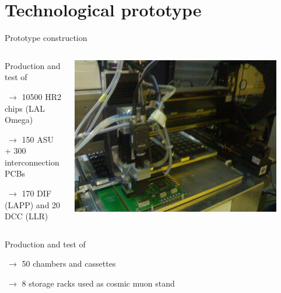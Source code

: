 \documentclass[10pt]{beamer}
\begin{document}
\section{ Technological prototype}
\begin{frame}[shrink=3]{Prototype construction}
  \begin{block}{}

    \begin{columns}

      \begin{column}{0.5\textwidth}
        \begin{block}{}
        { 
          Production and test of 
          \par $ ~\rightarrow$ 10500 HR2 chips  (LAL Omega)
          \par $ ~\rightarrow$  150 ASU + 300 interconnection PCBs
          \par $ ~ \rightarrow$ 170 DIF (LAPP) and 20 DCC (LLR)
        }
        \end{block}
      \end{column}
      
      \begin{column}{0.5\textwidth}
        \centerline{\includegraphics[width=0.9\textwidth]{jpg/ConstructionGantry.jpg}}
      \end{column}
    \end{columns}
  \end{block}
\begin{block}

    \begin{columns}

      \begin{column}{0.5\textwidth}
        \begin{block}{}
        {
          Production and test of 
          \par $ ~\rightarrow$ 50 chambers and cassettes
          \par $ ~\rightarrow$ 8 storage racks used as cosmic muon stand 
        }
        \end{block}
      \end{column}
      

\end{columns}
\end{block}
\end{frame}
\end{document}
